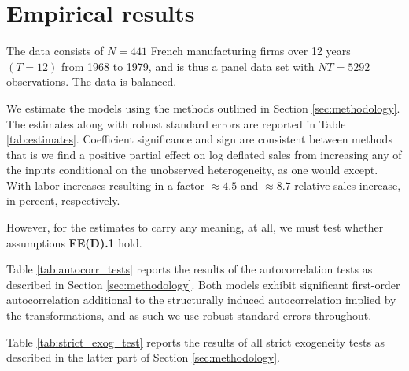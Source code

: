 \section{Empirical results}

The data consists of $N = 441$ French manufacturing firms over 12 years $(T=12)$ from 1968 to 1979, and is thus a panel data set with $NT = 5292$ observations. The data is balanced.  

We estimate the models using the methods outlined in Section \ref{sec:methodology}. The estimates along with robust standard errors are reported in Table \ref{tab:estimates}. Coefficient significance and sign are consistent between methods that is we find a positive partial effect on log deflated sales from increasing any of the inputs conditional on the unobserved heterogeneity, as one would except. With labor increases resulting in a factor $\approx 4.5$ and $\approx 8.7$ relative sales increase, in percent, respectively. 



However, for the estimates to carry any meaning, at all, we must test whether assumptions \textbf{FE(D).1} hold. 

Table \ref{tab:autocorr_tests} reports the results of the autocorrelation tests as described in Section \ref{sec:methodology}. Both models exhibit significant first-order autocorrelation additional to the structurally induced autocorrelation implied by the transformations, and as such we use robust standard errors throughout.

Table \ref{tab:strict_exog_test} reports the results of all strict exogeneity tests as described in the latter part of Section \ref{sec:methodology}.



